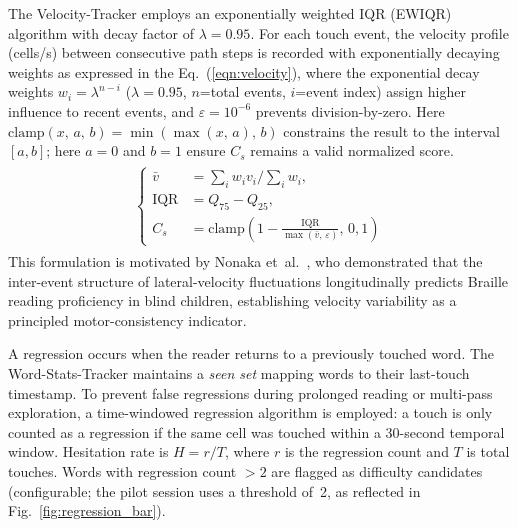 \documentclass[conference]{IEEEtran}
\begin{document}
    The Velocity-Tracker employs an exponentially weighted IQR (EWIQR)
    algorithm with decay factor of $\lambda=0.95$. For each touch event,
    the velocity profile (cells/s) between consecutive path steps is
    recorded with exponentially decaying weights as expressed in the 
    Eq.~(\ref{eqn:velocity}), where the exponential decay weights
    $w_i = \lambda^{n-i}$ ($\lambda=0.95$, $n$=total events, $i$=event index)
    assign higher influence to recent events, and $\varepsilon=10^{-6}$ prevents
    division-by-zero. Here $\mathrm{clamp}(x,\,a,\,b) = \min\!\left(\max(x,\,a),\,b\right)$
    constrains the result to the interval $[a, b]$; here $a = 0$ and
    $b = 1$ ensure $C_s$ remains a valid normalized score.
    \begin{align}
    \begin{split}
    \begin{cases}
        \bar{v} &= \textstyle\sum_i w_i v_i \big/ \sum_i w_i, \\
        \text{IQR} &= Q_{75} - Q_{25}, \\
        C_s &= \mathrm{clamp}\!\left(1 - \frac{\text{IQR}}
            {\max(\bar{v},\,\varepsilon)},\,0,1\right)
                 \label{eqn:velocity}
    \end{cases}
    \end{split}
    \end{align}
    This formulation is motivated by Nonaka et~al.~\cite{nonaka2021}, who
    demonstrated that the inter-event structure of lateral-velocity
    fluctuations longitudinally predicts Braille reading proficiency in
    blind children, establishing velocity variability as a principled
    motor-consistency indicator.


    A regression occurs when the reader returns to a previously touched word. The Word-Stats-Tracker maintains a \emph{seen set} mapping words to their last-touch timestamp. To prevent false regressions during prolonged reading or multi-pass exploration, a time-windowed regression algorithm is employed: a touch is only counted as a regression if the same cell was touched within a 30-second temporal window. Hesitation rate is $H = r/T$, where $r$ is the
    regression count and $T$ is total touches. Words with regression count $>2$ are flagged as difficulty candidates
    (configurable; the pilot session uses a threshold of~2,
    as reflected in Fig.~\ref{fig:regression_bar}).
\end{document}

